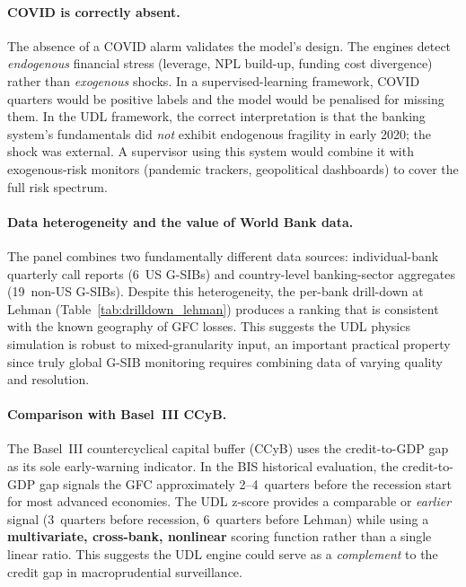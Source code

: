 \paragraph{COVID is correctly absent.}
The absence of a COVID alarm validates the model's design.  The
engines detect \emph{endogenous} financial stress (leverage,
NPL build-up, funding cost divergence) rather than \emph{exogenous}
shocks.  In a supervised-learning framework, COVID quarters would
be positive labels and the model would be penalised for missing
them.  In the UDL framework, the correct interpretation is that the
banking system's fundamentals did \emph{not} exhibit endogenous
fragility in early 2020; the shock was external.  A supervisor using
this system would combine it with exogenous-risk monitors (pandemic
trackers, geopolitical dashboards) to cover the full risk spectrum.

\paragraph{Data heterogeneity and the value of World Bank data.}
The panel combines two fundamentally different data sources:
individual-bank quarterly call reports (6~US G-SIBs) and
country-level banking-sector aggregates (19~non-US G-SIBs).
Despite this heterogeneity, the per-bank drill-down at Lehman
(Table~\ref{tab:drilldown_lehman}) produces a ranking that is
consistent with the known geography of GFC losses.  This suggests
the UDL physics simulation is robust to mixed-granularity input,
an important practical property since truly global G-SIB monitoring
requires combining data of varying quality and resolution.

\paragraph{Comparison with Basel~III CCyB.}
The Basel~III countercyclical capital buffer (CCyB) uses the
credit-to-GDP gap as its sole early-warning indicator.  In the BIS
historical evaluation, the credit-to-GDP gap signals the GFC
approximately 2--4~quarters before the recession start for most
advanced economies.  The UDL z-score provides a comparable or
\emph{earlier} signal (3~quarters before recession, 6~quarters
before Lehman) while using a \textbf{multivariate, cross-bank,
nonlinear} scoring function rather than a single linear ratio.
This suggests the UDL engine could serve as a \emph{complement}
to the credit gap in macroprudential surveillance.

